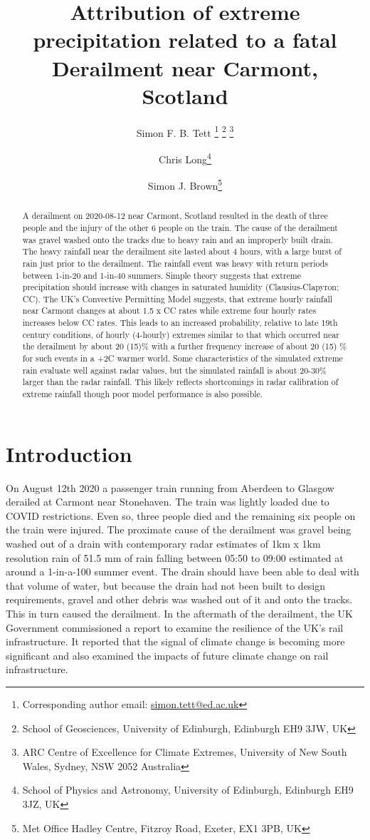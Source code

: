 \documentclass[11pt,a4paper]{article}
\title{Attribution of extreme precipitation related to a fatal Derailment  near Carmont, Scotland}
\author{Simon F. B. Tett
	\thanks{Corresponding author email: \href{mailto:simon.tett@ed.ac.uk}{simon.tett@ed.ac.uk}}
	\thanks{School of Geosciences, University of Edinburgh, Edinburgh EH9 3JW, UK} \thanks{ARC Centre of Excellence for Climate Extremes,
University of New South Wales,
Sydney, NSW 2052 Australia}
	\and 
Chris Long\thanks{School of Physics and Astronomy, University of Edinburgh, Edinburgh EH9 3JZ, UK}
\and 
Simon J. Brown\thanks{Met Office Hadley Centre, Fitzroy Road, Exeter, EX1 3PB, UK}}
\begin{document}
	
\maketitle

\graphicspath{{figures/}}


\begin{abstract}
	A derailment on 2020-08-12 near Carmont, Scotland resulted in the death of three people and the injury of the other 6 people on the train. The cause of the derailment was gravel washed onto the tracks due to heavy rain and an improperly built drain.  The heavy rainfall near the derailment site lasted about 4 hours, with a large burst of  rain just prior to the derailment. The rainfall event was heavy with return  periods between 1-in-20  and 1-in-40 summers. Simple theory suggests that extreme precipitation should increase with changes in saturated humidity (Clausius-Clapyron; CC). The UK's Convective Permitting Model suggests, that extreme hourly rainfall near Carmont changes at  about 1.5 x CC rates while extreme four hourly rates increases below  CC rates. This leads to an increased probability, relative to late 19th century conditions,  of hourly (4-hourly) extremes similar to that which occurred near the derailment by about 20 (15)\% with a further frequency increase of about 20 (15)  \% for such events in a +2C warmer world. Some characteristics of the simulated extreme rain evaluate well against radar values, but the  simulated rainfall is about 20-30\% larger than the radar rainfall. This likely reflects shortcomings in  radar  calibration of extreme rainfall though poor  model performance is also possible. 
\end{abstract}



\section{Introduction}
\label{sect:Intro}

On August 12th 2020 a passenger train running from Aberdeen to Glasgow derailed at Carmont near Stonehaven. The train was lightly loaded due to COVID restrictions. Even so,  three people died and the remaining six people on the train  were injured. The proximate cause of the derailment was gravel being washed out of a drain with contemporary radar estimates of 1km x 1km resolution rain of 51.5 mm of rain falling between 05:50 to 09:00  estimated at around a 1-in-a-100 summer event\parencite{carmontReport2024}. The drain should have been able to deal with that volume of water, but because the drain had not been built to design requirements, gravel and other debris was washed out of it and onto the tracks. This in turn caused the derailment. In the aftermath of the derailment, the UK Government commissioned a report to examine the resilience of the UK's rail infrastructure\parencite{NR_DfT_2021}. It reported that the signal of climate change is becoming more significant and also examined the impacts of future climate change  on rail infrastructure.
\end{document}

